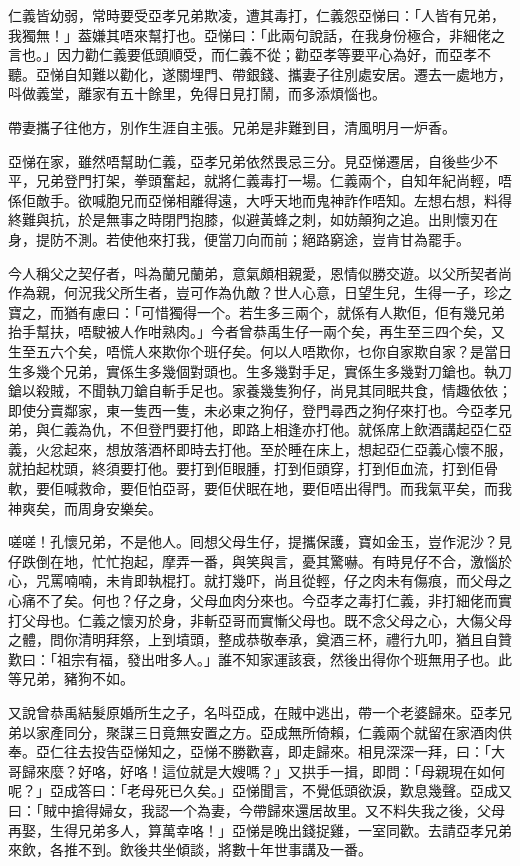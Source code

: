 \documentclass[a5paper, 12pt, openany]{book} %
\begin{document}
	仁義皆幼弱，常時要受亞孝兄弟欺凌，遭其毒打，仁義怨亞悌曰：「人皆有兄弟，我獨無！」葢嫌其唔來幫打也。亞悌曰：「此兩句說話，在我身份極合，非細佬之言也。」因力勸仁義要低頭順受，而仁義不從；勸亞孝等要平心為好，而亞孝不聽。亞悌自知難以勸化，遂關埋門、帶銀錢、攜妻子往別處安居。遷去一處地方，呌做義堂，離家有五十餘里，免得日見打鬧，而多添煩惱也。

	帶妻攜子往他方，別作生涯自主張。兄弟是非難到目，清風明月一炉香。

	亞悌在家，雖然唔幫助仁義，亞孝兄弟依然畏忌三分。見亞悌遷居，自後些少不平，兄弟登門打架，拳頭奮起，就將仁義毒打一場。仁義兩个，自知年紀尚輕，唔係佢敵手。欲喊胞兄而亞悌相離得遠，大呼天地而鬼神詐作唔知。左想右想，料得終難與抗，於是無事之時閉門抱膝，似避黃蜂之刺，如妨顛狗之追。出則懷刃在身，提防不測。若使他來打我，便當刀向而前；絕路窮途，豈肯甘為罷手。

	今人稱父之契仔者，呌為蘭兄蘭弟，意氣頗相親愛，恩情似勝交遊。以父所契者尚作為親，何況我父所生者，豈可作為仇敵？世人心意，日望生兒，生得一子，珍之寶之，而猶有慮曰：「可惜獨得一个。若生多三兩个，就係有人欺佢，佢有幾兄弟抬手幫扶，唔駛被人作咁熟肉。」今者曾恭禹生仔一兩个矣，再生至三四个矣，又生至五六个矣，唔慌人來欺你个班仔矣。何以人唔欺你，乜你自家欺自家？是當日生多幾个兄弟，實係生多幾個對頭也。生多幾對手足，實係生多幾對刀鎗也。執刀鎗以殺賊，不聞執刀鎗自斬手足也。家養幾隻狗仔，尚見其同眠共食，情趣依依；即使分賣鄰家，東一隻西一隻，未必東之狗仔，登門尋西之狗仔來打也。今亞孝兄弟，與仁義為仇，不但登門要打他，即路上相逢亦打他。就係席上飲酒講起亞仁亞義，火忿起來，想放落酒杯即時去打他。至於睡在床上，想起亞仁亞義心懷不服，就拍起枕頭，終須要打他。要打到佢眼腫，打到佢頭穿，打到佢血流，打到佢骨軟，要佢喊救命，要佢怕亞哥，要佢伏眠在地，要佢唔出得門。而我氣平矣，而我神爽矣，而周身安樂矣。

	嗟嗟！孔懷兄弟，不是他人。囘想父母生仔，提攜保護，寶如金玉，豈作泥沙？見仔跌倒在地，忙忙抱起，摩弄一番，與笑與言，憂其驚嚇。有時見仔不合，激惱於心，咒罵喃喃，未肯即執棍打。就打幾吓，尚且從輕，仔之肉未有傷痕，而父母之心痛不了矣。何也？仔之身，父母血肉分來也。今亞孝之毒打仁義，非打細佬而實打父母也。仁義之懷刃於身，非斬亞哥而實慚父母也。既不念父母之心，大傷父母之體，問你清明拜祭，上到墳頭，整成恭敬奉承，奠酒三杯，禮行九叩，猶且自贊歎曰：「祖宗有福，發出咁多人。」誰不知家運該衰，然後出得你个班無用子也。此等兄弟，豬狗不如。

	又說曾恭禹結髮原婚所生之子，名呌亞成，在賊中逃出，帶一个老婆歸來。亞孝兄弟以家產同分，聚謀三日竟無安置之方。亞成無所倚賴，仁義兩个就留在家酒肉供奉。亞仁往去投告亞悌知之，亞悌不勝歡喜，即走歸來。相見深深一拜，曰：「大哥歸來麼？好咯，好咯！這位就是大嫂嗎？」又拱手一揖，即問：「母親現在如何呢？」亞成答曰：「老母死已久矣。」亞悌聞言，不覺低頭欲淚，歎息幾聲。亞成又曰：「賊中搶得婦女，我認一个為妻，今帶歸來還居故里。又不料失我之後，父母再娶，生得兄弟多人，算萬幸咯！」亞悌是晚出錢捉雞，一室同歡。去請亞孝兄弟來飲，各推不到。飲後共坐傾談，將數十年世事講及一番。
\end{document}
